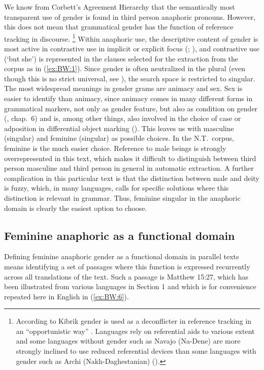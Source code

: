 \documentclass[output=collectionpaper]{langsci/langscibook}
\begin{document}
We know from Corbett’s Agreement Hierarchy that the semantically most transparent use of gender is found in third person anaphoric pronouns. However, this does not mean that grammatical gender has the function of reference tracking in discourse.%
\footnote{%
According to Kibrik gender is used as a deconflicter in reference tracking in an “opportunistic way” \citet[359]{Kibrik2011}. Languages rely on referential aids to various extent and some languages without gender such as Navajo (Na-Dene) are more strongly inclined to use reduced referential devices than some languages with gender such as Archi (Nakh-Daghestanian) (\citealt[336]{Kibrik2011}).
} %
Within anaphoric use, the descriptive content of gender is most active in contrastive use in implicit or explicit focus (\citealt[227]{Bosch1988}; \citealt[25]{Seifart2018}), and contrastive use (‘but she’) is represented in the clauses selected for the extraction from the corpus as in (\ref{ex:BW:1}). Since gender is often neutralized in the plural (even though this is no strict universal, see \citealt{Plank1997}), the search space is restricted to singular. The most widespread meanings in gender grams are animacy and sex. Sex is easier to identify than animacy, since animacy comes in many different forms in grammatical markers, not only as gender feature, but also as condition on gender (\citealt{Corbett2006}, chap.~6) and is, among other things, also involved in the choice of case or adposition in differential object marking (\citealt[166]{Croft2003}). This leaves us with masculine (singular) and feminine (singular) as possible choices. In the N.T.\ corpus, feminine is the much easier choice. Reference to male beings is strongly overrepresented in this text, which makes it difficult to distinguish between third person masculine and third person in general in automatic extraction. A further complication in this particular text is that the distinction between male and deity is fuzzy, which, in many languages, calls for specific solutions where this distinction is relevant in grammar. Thus, feminine singular in the anaphoric domain is clearly the easiest option to choose.

\subsection{Feminine anaphoric as a functional domain}
\label{sec:BW:2.3}

Defining feminine anaphoric gender as a functional domain in parallel texts means identifying a set of passages where this function is expressed recurrently across all translations of the text. Such a passage is Matthew 15:27, which has been illustrated from various languages in Section 1 and which is for convenience repeated here in English in (\ref{ex:BW:6}).
\end{document}
